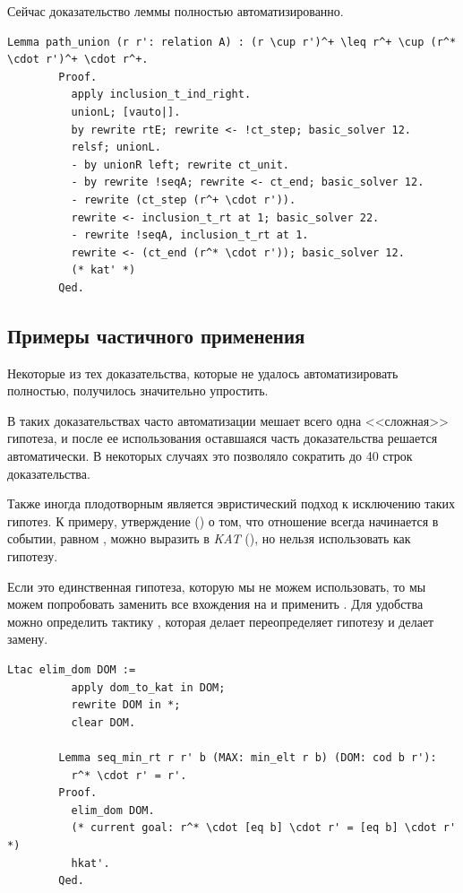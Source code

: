 \documentclass[times
              ]{itmo-student-thesis}
\begin{document}
      Сейчас доказательство леммы полностью автоматизированно.

      \begin{lstlisting}[float=false, language=Coq, gobble=8, label={lst:path_union},
        caption={Автоматизация сложных преобразований}]
        Lemma path_union (r r': relation A) : (r \cup r')^+ \leq r^+ \cup (r^* \cdot r')^+ \cdot r^+.
        Proof.
          apply inclusion_t_ind_right.
          unionL; [vauto|].
          by rewrite rtE; rewrite <- !ct_step; basic_solver 12.
          relsf; unionL.
          - by unionR left; rewrite ct_unit.
          - by rewrite !seqA; rewrite <- ct_end; basic_solver 12.
          - rewrite (ct_step (r^+ \cdot r')).
          rewrite <- inclusion_t_rt at 1; basic_solver 22.
          - rewrite !seqA, inclusion_t_rt at 1.
          rewrite <- (ct_end (r^* \cdot r')); basic_solver 12.
          (* kat' *)
        Qed.
      \end{lstlisting}
    
    \subsection{Примеры частичного применения }
      Некоторые из тех доказательства, которые не удалось автоматизировать полностью, получилось
      значительно упростить.

      В таких доказательствах часто автоматизации мешает всего одна <<сложная>> гипотеза,
      и после ее использования оставшаяся часть доказательства решается автоматически. В некоторых
      случаях это позволяло сократить до 40 строк доказательства.

      Также иногда плодотворным является эвристический подход к исключению таких гипотез.
      К примеру, утверждение () о том, что отношение  всегда начинается в
      событии, равном , можно выразить в \textit{KAT} (), но нельзя
      использовать как гипотезу.

      Если это единственная гипотеза, которую мы не можем использовать, то мы можем попробовать
      заменить все вхождения  на
       и применить . Для удобства можно определить тактику ,
      которая делает переопределяет гипотезу и делает замену.

      \begin{lstlisting}[float=false, language=Coq, gobble=8, label={lst:dom}]
        Ltac elim_dom DOM :=
          apply dom_to_kat in DOM;
          rewrite DOM in *;
          clear DOM.

        Lemma seq_min_rt r r' b (MAX: min_elt r b) (DOM: cod b r'):
          r^* \cdot r' = r'.
        Proof.
          elim_dom DOM.
          (* current goal: r^* \cdot [eq b] \cdot r' = [eq b] \cdot r' *)
          hkat'.
        Qed.
      \end{lstlisting}
      
\end{document}
